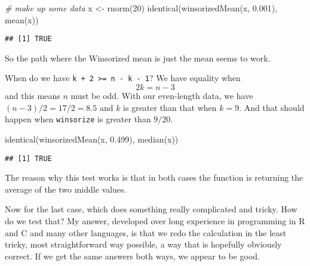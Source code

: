 \documentclass[
]{article}
\newenvironment{Shaded}{\begin{snugshade}}{\end{snugshade}}
\newcommand{\CommentTok}[1]{\textcolor[rgb]{0.56,0.35,0.01}{\textit{#1}}}
\newcommand{\DecValTok}[1]{\textcolor[rgb]{0.00,0.00,0.81}{#1}}
\newcommand{\FloatTok}[1]{\textcolor[rgb]{0.00,0.00,0.81}{#1}}
\newcommand{\FunctionTok}[1]{\textcolor[rgb]{0.00,0.00,0.00}{#1}}
\newcommand{\NormalTok}[1]{#1}
\newcommand{\OtherTok}[1]{\textcolor[rgb]{0.56,0.35,0.01}{#1}}
\begin{document}
\begin{Shaded}
\begin{Highlighting}[]
\CommentTok{\# make up some data}
\NormalTok{x }\OtherTok{\textless{}{-}} \FunctionTok{rnorm}\NormalTok{(}\DecValTok{20}\NormalTok{)}
\FunctionTok{identical}\NormalTok{(}\FunctionTok{winsorizedMean}\NormalTok{(x, }\FloatTok{0.001}\NormalTok{), }\FunctionTok{mean}\NormalTok{(x))}
\end{Highlighting}
\end{Shaded}

\begin{verbatim}
## [1] TRUE
\end{verbatim}

So the path where the Winsorized mean is just the mean seems to work.

When do we have \texttt{k\ +\ 2\ \textgreater{}=\ n\ -\ k\ -\ 1}? We
have equality when \[
   2 k = n - 3
\] and this means \(n\) must be odd. With our even-length data, we have
\((n - 3) / 2 = 17 / 2 = 8.5\) and \(k\) is greater than that when
\(k = 9\). And that should happen when \texttt{winsorize} is greater
than \(9 / 20\).

\begin{Shaded}
\begin{Highlighting}[]
\FunctionTok{identical}\NormalTok{(}\FunctionTok{winsorizedMean}\NormalTok{(x, }\FloatTok{0.499}\NormalTok{), }\FunctionTok{median}\NormalTok{(x))}
\end{Highlighting}
\end{Shaded}

\begin{verbatim}
## [1] TRUE
\end{verbatim}

The reason why this test works is that in both cases the function is
returning the average of the two middle values.

Now for the last case, which does something really complicated and
tricky. How do we test that? My answer, developed over long experience
in programming in R and C and many other languages, is that we redo the
calculation in the least tricky, most straightforward way possible, a
way that is hopefully obviously correct. If we get the same answers both
ways, we appear to be good.
\end{document}

